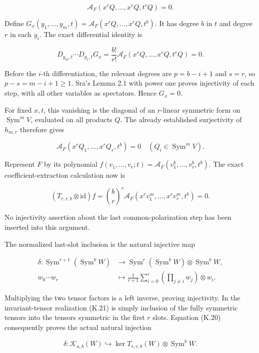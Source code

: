 \documentclass[
  10pt,
]{article}
\begin{document}
\[
\mathcal A_F(x^rQ,\ldots,x^rQ,t^rQ)=0.
\tag{K.17}
\]

Define \(G_x(y_1,\ldots,y_m,t)=
\mathcal A_F(x^rQ,\ldots,x^rQ,t^b)\). It has degree \(b\) in \(t\) and
degree \(r\) in each \(y_i\). The exact differential identity is

\[
D_{y_m,t}\cdots D_{y_1,t}G_x
=\frac{b!}{r!}
\mathcal A_F(x^rQ,\ldots,x^rQ,t^rQ)=0.
\tag{K.18}
\]

Before the \(i\)-th differentiation, the relevant degrees are
\(p=b-i+1\) and \(s=r\), so \(p-s=m-i+1\ge1\). Sra's Lemma 2.1 with
power one proves injectivity of each step, with all other variables as
spectators. Hence \(G_x=0\).

For fixed \(x,t\), this vanishing is the diagonal of an \(r\)-linear
symmetric form on \(\operatorname{Sym}^mV\), evaluated on all products
\(Q\). The already established surjectivity of \(h_{m,r}\) therefore
gives

\[
\mathcal A_F(x^rQ_1,\ldots,x^rQ_r,t^b)=0
\quad(Q_i\in\operatorname{Sym}^mV).
\tag{K.19}
\]

Represent \(F\) by its polynomial \(f(v_1,\ldots,v_r;t)=
\mathcal A_F(v_1^b,\ldots,v_r^b,t^b)\). The exact coefficient-extraction
calculation now is

\[
(T_{r,r,b}\otimes\mathrm{id})f
=\binom{b}{r}^{r}
\mathcal A_F(x^rv_1^m,\ldots,x^rv_r^m,t^b)=0.
\tag{K.20}
\]

No injectivity assertion about the last common-polarization step has
been inserted into this argument.

The normalized last-slot inclusion is the natural injective map

\[
\begin{aligned}
\delta:\operatorname{Sym}^{r+1}(\operatorname{Sym}^bW)
&\longrightarrow
\operatorname{Sym}^r(\operatorname{Sym}^bW)
\otimes\operatorname{Sym}^bW,\\
w_0\cdots w_r&\longmapsto
\frac1{r+1}\sum_{i=0}^r
\left(\prod_{j\ne i}w_j\right)\otimes w_i.
\end{aligned}
\tag{K.21}
\]

Multiplying the two tensor factors is a left inverse, proving
injectivity. In the invariant-tensor realization (K.21) is simply
inclusion of the fully symmetric tensors into the tensors symmetric in
the first \(r\) slots. Equation (K.20) consequently proves the actual
natural injection

\[
\boxed{
\delta:\mathcal K_{a,b}(W)\hookrightarrow
\ker T_{r,r,b}(W)\otimes\operatorname{Sym}^bW.}
\tag{K.22}
\]
\end{document}

